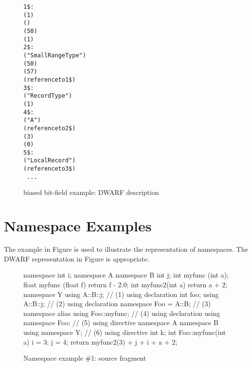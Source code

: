 \begin{figure}[ht]
\begin{dwflisting}
\begin{alltt}
1\$: \DWTAGbasetype
        \DWATbytesize(1)
        \DWATencoding(\DWATEunsigned)
        \DWATbias(50)
        \DWATartificial(1)
2\$: \DWTAGsubrangetype
        \DWATname("SmallRangeType")
        \DWATlowerbound(50)
        \DWATupperbound(57)
        \DWATtype(reference to 1\$)
3\$: \DWTAGstructuretype
        \DWATname("RecordType")
        \DWATbytesize(1)
4\$:    \DWTAGmember
            \DWATname("A")
            \DWATtype(reference to 2\$)
            \DWATbitsize(3)
            \DWATdatabitoffset(0)
5\$: \DWTAGvariable
            \DWATname("LocalRecord")
            \DWATtype(reference to 3\$)
            \DWATlocation\ ...
\end{alltt}
\end{dwflisting}
\caption{\Ada{} biased bit-field example: DWARF description}
\label{fig:adabiasedbitfieldexampledwarfdescription}
\end{figure}


\clearpage
\section{Namespace Examples}
\label{app:namespaceexamples}

The  example in 
Figure 
is used 
to illustrate the representation of namespaces.
The DWARF representation in 
Figure 
is appropriate.

\begin{figure}[ht]
\begin{nlnlisting}
namespace {
    int i;
}
namespace A {
    namespace B {
        int j;
        int   myfunc (int a);
        float myfunc (float f) { return f - 2.0; }
        int   myfunc2(int a)   { return a + 2; }
    }
}
namespace Y {
    using A::B::j;         // (1) using declaration
    int foo;
}
using A::B::j;             // (2) using declaration
namespace Foo = A::B;      // (3) namespace alias
using Foo::myfunc;         // (4) using declaration
using namespace Foo;       // (5) using directive
namespace A {
    namespace B {
        using namespace Y; // (6) using directive
        int k;
    }
}
int Foo::myfunc(int a)
{
    i = 3;
    j = 4;
    return myfunc2(3) + j + i + a + 2;
}
\end{nlnlisting}
\caption{Namespace example \#1: source fragment}
\label{fig:namespaceexample1sourcefragment}
\end{figure}


